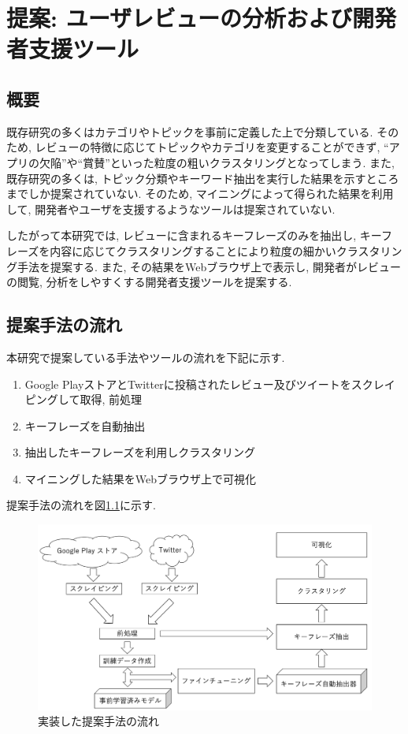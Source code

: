 \chapter{提案: ユーザレビューの分析および開発者支援ツール}
\label{chap:teian}


\section{概要}
既存研究の多くはカテゴリやトピックを事前に定義した上で分類している. そのため, レビューの特徴に応じてトピックやカテゴリを変更することができず, ``アプリの欠陥''や``賞賛''といった粒度の粗いクラスタリングとなってしまう. 
また, 既存研究の多くは, トピック分類やキーワード抽出を実行した結果を示すところまでしか提案されていない. そのため, マイニングによって得られた結果を利用して, 開発者やユーザを支援するようなツールは提案されていない. 

したがって本研究では, レビューに含まれるキーフレーズのみを抽出し, キーフレーズを内容に応じてクラスタリングすることにより粒度の細かいクラスタリング手法を提案する. 
また, その結果をWebブラウザ上で表示し, 開発者がレビューの閲覧, 分析をしやすくする開発者支援ツールを提案する. 

\section{提案手法の流れ}
本研究で提案している手法やツールの流れを下記に示す. 

\begin{enumerate}
  \item Google PlayストアとTwitterに投稿されたレビュー及びツイートをスクレイピングして取得, 前処理
  \item キーフレーズを自動抽出
  \item 抽出したキーフレーズを利用しクラスタリング
  \item マイニングした結果をWebブラウザ上で可視化
\end{enumerate}

提案手法の流れを図\ref{fig:nagare}に示す. 

\begin{figure}[H]
  \centering
  \includegraphics[scale=0.35]
    {contents/images/zisso.png}
  \caption{実装した提案手法の流れ\label{fig:nagare}}
\end{figure}

